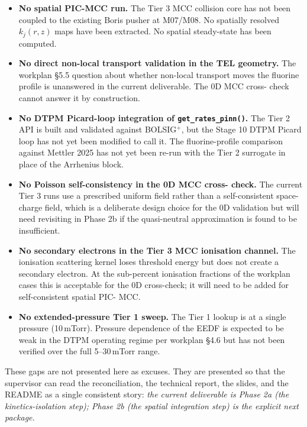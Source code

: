 \documentclass[11pt,a4paper]{article}
\begin{document}
\begin{itemize}
  \item \textbf{No spatial PIC-MCC run.} The Tier 3 MCC collision
        core has not been coupled to the existing Boris pusher at
        M07/M08. No spatially resolved $k_j(r, z)$ maps have been
        extracted. No spatial steady-state has been computed.
  \item \textbf{No direct non-local transport validation in the
        TEL geometry.} The workplan §5.5 question about whether
        non-local transport moves the fluorine profile is
        unanswered in the current deliverable. The 0D MCC cross-
        check cannot answer it by construction.
  \item \textbf{No DTPM Picard-loop integration of
        \texttt{get\_rates\_pinn()}.} The Tier 2 API is built and
        validated against BOLSIG$^+$, but the Stage 10 DTPM Picard
        loop has not yet been modified to call it. The
        fluorine-profile comparison against Mettler 2025 has not
        yet been re-run with the Tier 2 surrogate in place of the
        Arrhenius block.
  \item \textbf{No Poisson self-consistency in the 0D MCC cross-
        check.} The current Tier 3 runs use a prescribed uniform
        field rather than a self-consistent space-charge field,
        which is a deliberate design choice for the 0D validation
        but will need revisiting in Phase 2b if the quasi-neutral
        approximation is found to be insufficient.
  \item \textbf{No secondary electrons in the Tier 3 MCC
        ionisation channel.} The ionisation scattering kernel
        loses threshold energy but does not create a secondary
        electron. At the sub-percent ionisation fractions of the
        workplan cases this is acceptable for the 0D cross-check;
        it will need to be added for self-consistent spatial PIC-
        MCC.
  \item \textbf{No extended-pressure Tier 1 sweep.} The Tier 1
        lookup is at a single pressure (10\,mTorr). Pressure
        dependence of the EEDF is expected to be weak in the DTPM
        operating regime per workplan §4.6 but has not been
        verified over the full 5--30\,mTorr range.
\end{itemize}

These gaps are not presented here as excuses. They are presented so
that the supervisor can read the reconciliation, the technical
report, the slides, and the README as a single consistent story:
\emph{the current deliverable is Phase 2a (the kinetics-isolation
step); Phase 2b (the spatial integration step) is the explicit next
package.}
\end{document}
